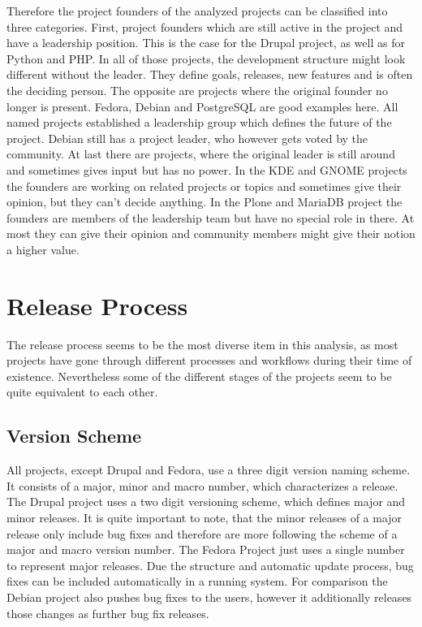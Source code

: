 Therefore the project founders of the analyzed projects can be classified into
three categories. First, project founders which are still active in the project
and have a leadership position. This is the case for the Drupal project, as
well as for Python and PHP. In all of those projects, the development structure
might look different without the leader. They define goals, releases, new
features and is often the deciding person. The opposite are projects where the
original founder no longer is present. Fedora, Debian and PostgreSQL are good
examples here. All named projects established a leadership group which defines
the future of the project. Debian still has a project leader, who however gets
voted by the community. At last there are projects, where the original leader
is still around and sometimes gives input but has no power. In the KDE and
GNOME projects the founders are working on related projects or topics and
sometimes give their opinion, but they can't decide anything. In the Plone and
MariaDB project the founders are members of the leadership team but have no
special role in there. At most they can give their opinion and community
members might give their notion a higher value.



\section{Release Process} %
\label{sec:Release Process}

The release process seems to be the most diverse item in this analysis, as most
projects have gone through different processes and workflows during their time
of existence. Nevertheless some of the different stages of the projects seem to
be quite equivalent to each other.

\subsection{Version Scheme} %
\label{sub:Version Scheme}

All projects, except Drupal and Fedora, use a three digit version naming
scheme. It consists of a major, minor and macro number, which characterizes a
release. The Drupal project uses a two digit versioning scheme, which defines
major and minor releases. It is quite important to note, that the minor
releases of a major release only include bug fixes and therefore are more
following the scheme of a major and macro version number. The Fedora Project
just uses a single number to represent major releases. Due the structure and
automatic update process, bug fixes can be included automatically in a running
system. For comparison the Debian project also pushes bug fixes to the users,
however it additionally releases those changes as further bug fix releases.

